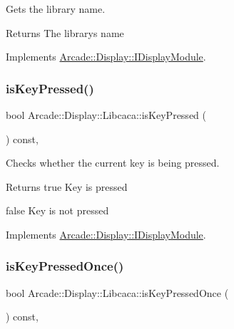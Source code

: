 Gets the library name. 

\begin{DoxyReturn}{Returns}
The library\textquotesingle{}s name 
\end{DoxyReturn}


Implements \mbox{\hyperlink{classArcade_1_1Display_1_1IDisplayModule_a0d8e957815e94766bdefbd7a5043e81a}{Arcade\+::\+Display\+::\+I\+Display\+Module}}.

\mbox{\label{classArcade_1_1Display_1_1Libcaca_a4d76639289eee2453a416ff0fc051fe3}} 
\subsubsection{\texorpdfstring{isKeyPressed()}{isKeyPressed()}}
{\footnotesize\ttfamily bool Arcade\+::\+Display\+::\+Libcaca\+::is\+Key\+Pressed (\begin{DoxyParamCaption}\item[{\mbox{\hyperlink{classArcade_1_1Display_1_1IDisplayModule_a8da3f6b309ca0581473ae8cc8789b619}{I\+Display\+Module\+::\+Keys}}}]{ }\end{DoxyParamCaption}) const\hspace{0.3cm}{\ttfamily [final]}, {\ttfamily [virtual]}}



Checks whether the current key is being pressed. 

\begin{DoxyReturn}{Returns}
true Key is pressed 

false Key is not pressed 
\end{DoxyReturn}


Implements \mbox{\hyperlink{classArcade_1_1Display_1_1IDisplayModule_ab3d02b76c08ff2deb728dc9f0d557f43}{Arcade\+::\+Display\+::\+I\+Display\+Module}}.

\mbox{\label{classArcade_1_1Display_1_1Libcaca_a2de2c9cd935fbee371fa5215bd45c137}} 
\subsubsection{\texorpdfstring{isKeyPressedOnce()}{isKeyPressedOnce()}}
{\footnotesize\ttfamily bool Arcade\+::\+Display\+::\+Libcaca\+::is\+Key\+Pressed\+Once (\begin{DoxyParamCaption}\item[{\mbox{\hyperlink{classArcade_1_1Display_1_1IDisplayModule_a8da3f6b309ca0581473ae8cc8789b619}{I\+Display\+Module\+::\+Keys}}}]{ }\end{DoxyParamCaption}) const\hspace{0.3cm}{\ttfamily [final]}, {\ttfamily [virtual]}}




